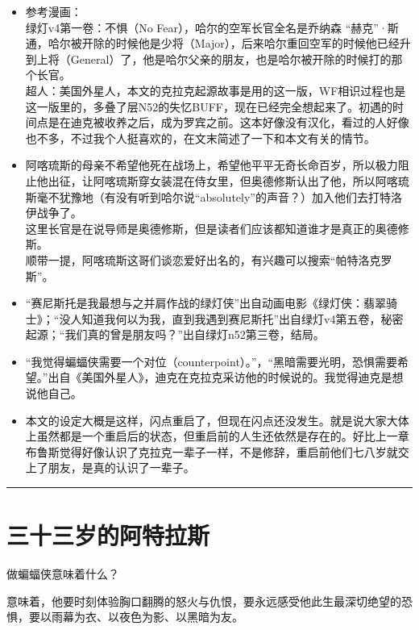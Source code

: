 \documentclass[../main]{subfiles}
\begin{document}
\begin{itemize}
    \item
          参考漫画：\\
          绿灯v4第一卷：不惧（No Fear），哈尔的空军长官全名是乔纳森
          “赫克”·斯通，哈尔被开除的时候他是少将（Major），后来哈尔重回空军的时候他已经升到上将（General）了，他是哈尔父亲的朋友，也是哈尔被开除的时候打的那个长官。\\
          超人：美国外星人，本文的克拉克起源故事是用的这一版，WF相识过程也是这一版里的，多叠了层N52的失忆BUFF，现在已经完全想起来了。初遇的时间点是在迪克被收养之后，成为罗宾之前。这本好像没有汉化，看过的人好像也不多，不过我个人挺喜欢的，在文末简述了一下和本文有关的情节。
    \item
          阿喀琉斯的母亲不希望他死在战场上，希望他平平无奇长命百岁，所以极力阻止他出征，让阿喀琉斯穿女装混在侍女里，但奥德修斯认出了他，所以阿喀琉斯毫不犹豫地（有没有听到哈尔说“absolutely”的声音？）加入他们去打特洛伊战争了。\\
          这里长官是在说导师是奥德修斯，但是读者们应该都知道谁才是真正的奥德修斯。\\
          顺带一提，阿喀琉斯这哥们谈恋爱好出名的，有兴趣可以搜索“帕特洛克罗斯”。
    \item
          “赛尼斯托是我最想与之并肩作战的绿灯侠”出自动画电影《绿灯侠：翡翠骑士》；“没人知道我何以为我，直到我遇到赛尼斯托”出自绿灯v4第五卷，秘密起源；“我们真的曾是朋友吗？”出自绿灯n52第三卷，结局。
    \item
          “我觉得蝙蝠侠需要一个对位（counterpoint）。”，“黑暗需要光明，恐惧需要希望。”出自《美国外星人》，迪克在克拉克采访他的时候说的。我觉得迪克是想说他自己。
    \item
          本文的设定大概是这样，闪点重启了，但现在闪点还没发生。就是说大家大体上虽然都是一个重启后的状态，但重启前的人生还依然是存在的。好比上一章布鲁斯觉得好像认识了克拉克一辈子一样，不是修辞，重启前他们七八岁就交上了朋友，是真的认识了一辈子。
\end{itemize}

\begin{center}\rule{0.5\linewidth}{0.5pt}\end{center}

\section{三十三岁的阿特拉斯}

做蝙蝠侠意味着什么？

意味着，他要时刻体验胸口翻腾的怒火与仇恨，要永远感受他此生最深切绝望的恐惧，要以雨幕为衣、以夜色为影、以黑暗为友。
\end{document}
